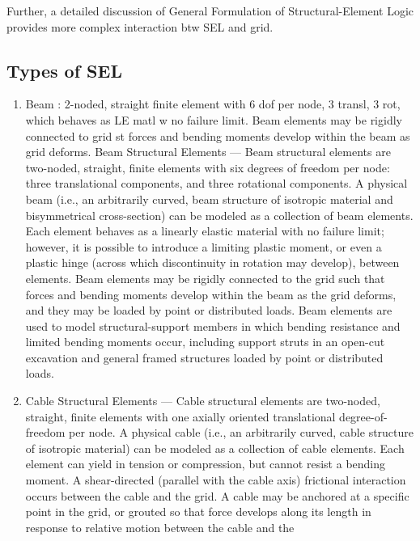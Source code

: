 \documentclass[a4paper, nobind]{templates/ociamthesis}
\providecommand{\tightlist}{%
  \setlength{\itemsep}{0pt}\setlength{\parskip}{0pt}}
\begin{document}
Further, a detailed discussion of General Formulation of
Structural-Element Logic provides more complex interaction btw SEL and
grid.

\hypertarget{types-of-sel}{%
\subsection{Types of SEL}\label{types-of-sel}}

\begin{enumerate}
\def\labelenumi{\arabic{enumi}.}
\tightlist
\item
  Beam : 2-noded, straight finite element with 6 dof per node, 3
  transl, 3 rot, which behaves as LE matl w no failure limit. Beam
  elements may be rigidly connected to grid st forces and bending
  moments develop within the beam as grid deforms. Beam Structural
  Elements --- Beam structural elements are two-noded, straight,
  finite elements with six degrees of freedom per node: three
  translational components, and three rotational components. A
  physical beam (i.e., an arbitrarily curved, beam structure of
  isotropic material and bisymmetrical cross-section) can be modeled
  as a collection of beam elements. Each element behaves as a linearly
  elastic material with no failure limit; however, it is possible to
  introduce a limiting plastic moment, or even a plastic hinge (across
  which discontinuity in rotation may develop), between elements. Beam
  elements may be rigidly connected to the grid such that forces and
  bending moments develop within the beam as the grid deforms, and
  they may be loaded by point or distributed loads. Beam elements are
  used to model structural-support members in which bending resistance
  and limited bending moments occur, including support struts in an
  open-cut excavation and general framed structures loaded by point or
  distributed loads.
\item
  Cable Structural Elements --- Cable structural elements are
  two-noded, straight, finite elements with one axially oriented
  translational degree-of-freedom per node. A physical cable (i.e., an
  arbitrarily curved, cable structure of isotropic material) can be
  modeled as a collection of cable elements. Each element can yield in
  tension or compression, but cannot resist a bending moment. A
  shear-directed (parallel with the cable axis) frictional interaction
  occurs between the cable and the grid. A cable may be anchored at a
  specific point in the grid, or grouted so that force develops along
  its length in response to relative motion between the cable and the

\end{enumerate}
\end{document}
